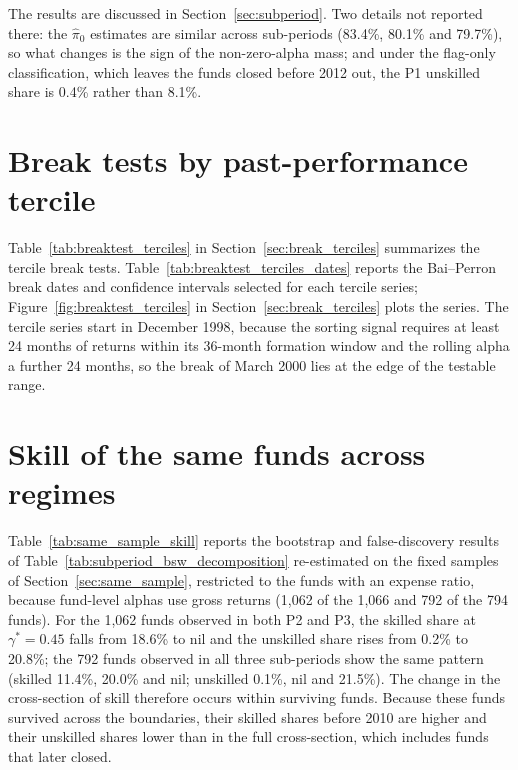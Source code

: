 \documentclass[12pt, oneside]{report}
\begin{document}










\noindent The results are discussed in Section~\ref{sec:subperiod}. Two
details not reported there: the $\hat{\pi}_0$ estimates are similar across
sub-periods (83.4\%, 80.1\% and 79.7\%), so what changes is the sign of
the non-zero-alpha mass; and under the flag-only classification, which
leaves the funds closed before 2012 out, the P1 unskilled share is 0.4\%
rather than 8.1\%.

\section{Break tests by past-performance tercile}
\label{sec:a_break_terciles}

\noindent Table~\ref{tab:breaktest_terciles} in
Section~\ref{sec:break_terciles} summarizes the tercile break tests.
Table~\ref{tab:breaktest_terciles_dates} reports the Bai--Perron break
dates and confidence intervals selected for each tercile series;
Figure~\ref{fig:breaktest_terciles} in Section~\ref{sec:break_terciles}
plots the series. The tercile series
start in December 1998, because the sorting signal requires at least 24
months of returns within its 36-month formation window and the rolling
alpha a further 24 months, so the
break of March 2000 lies at the edge of the testable range.



\section{Skill of the same funds across regimes}
\label{sec:a_same_sample}

\noindent Table~\ref{tab:same_sample_skill} reports the bootstrap and
false-discovery results of Table~\ref{tab:subperiod_bsw_decomposition}
re-estimated on the fixed samples of Section~\ref{sec:same_sample}, restricted
to the funds with an expense ratio, because fund-level alphas use gross
returns (1{,}062 of the 1{,}066 and 792 of the 794 funds). For
the 1{,}062 funds observed in both P2 and P3, the skilled share at
$\gamma^* = 0.45$ falls from 18.6\% to nil and the unskilled share rises
from 0.2\% to 20.8\%; the 792 funds observed in all three sub-periods
show the same pattern (skilled 11.4\%, 20.0\% and nil; unskilled 0.1\%,
nil and 21.5\%). The change in the cross-section of skill therefore
occurs within surviving funds. Because these funds survived across the
boundaries, their skilled shares before 2010 are higher and their
unskilled shares lower than in the full cross-section, which includes
funds that later closed.
\end{document}
